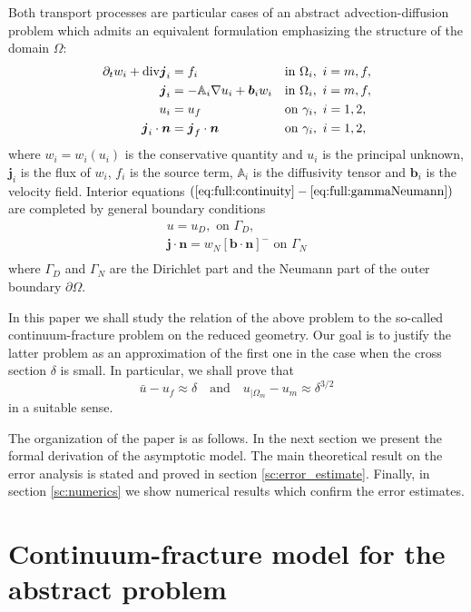 \documentclass[a4paper]{article}
\def\prtl{\partial}
\def\vc#1{\mathbf{\boldsymbol{#1}}}     %
\def\tn#1{{\mathbb{#1}}}    %
\def\div{{\rm div}}
\def\grad{\nabla}
\begin{document}
Both transport processes are particular cases of an abstract advection-diffusion problem which admits an equivalent formulation
emphasizing the structure of the domain $\Omega$:
\begin{align}
  \label{eq:full:continuity}
  \prtl_t w_i + \div \vc j_i &= f_i&&  \text{in } \Omega_i,\ i=m,f,\\
  \label{eq:full:flux}
  \vc j_i &= - \tn A_i\grad u_i + \vc b_i w_i&& \text{in } \Omega_i,\ i=m,f,\\
  \label{eq:full:gammaDirichlet}
  u_i &= u_f&& \text{on } \gamma_i,\ i=1,2,\\
  \label{eq:full:gammaNeumann}
  \vc j_i \cdot \vc n &= \vc j_f \cdot \vc n&& \text{on } \gamma_i,\ i=1,2,
\end{align}
where $w_i=w_i(u_i)$ is the conservative quantity and $u_i$ is the principal unknown, $\vc j_i$ is the flux of $w_i$, $f_i$ is the source term,
$\tn A_i$ is the diffusivity tensor and $\vc b_i$ is the velocity field. 
Interior equations $(\ref{eq:full:continuity}-\ref{eq:full:gammaNeumann})$ are completed by general boundary conditions
\begin{align}
  \label{eq:full:outerDirichlet}
  u=u_D, \text{ on } \Gamma_D,\\
  \label{eq:full:outerNeumann}
  \vc j \cdot \vc n= w_N [\vc b \cdot \vc n]^- \mbox{ on }\Gamma_N\\
\end{align}
where $\Gamma_D$ and $\Gamma_N$ are the Dirichlet part and the Neumann part of the outer boundary $\prtl\Omega$.


In this paper we shall study the relation of the above problem to the so-called continuum-fracture problem on the reduced geometry.
Our goal is to justify the latter problem as an approximation of the first one in the case when the cross section $\delta$ is small.
In particular, we shall prove that
\[ \bar u - u_f \approx \delta\quad\mbox{and}\quad u_{|\Omega_m}-u_m \approx \delta^{3/2} \]
in a suitable sense.


The organization of the paper is as follows.
In the next section we present the formal derivation of the asymptotic model.
The main theoretical result on the error analysis is stated and proved in section \ref{sc:error_estimate}.
Finally, in section \ref{sc:numerics} we show numerical results which confirm the error estimates.



\section{Continuum-fracture model for the abstract problem}
\label{sc:ad_on_fractures}
\end{document}
